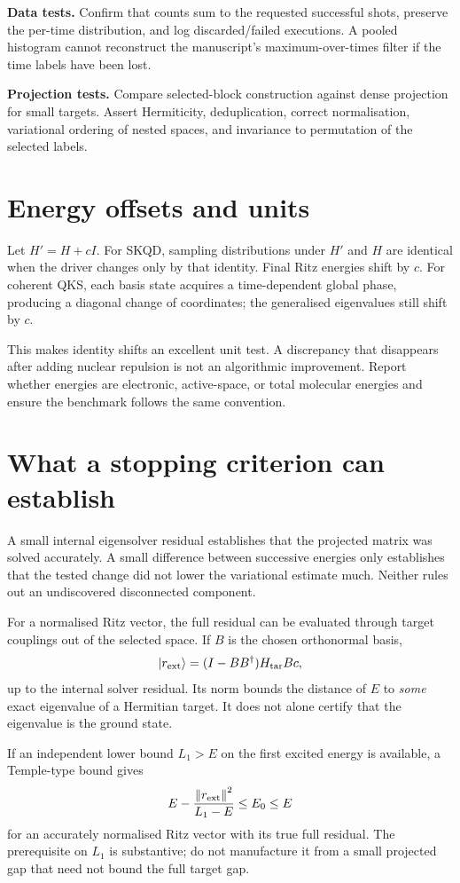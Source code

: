 \documentclass[11pt,a4paper,oneside]{report}
\newcommand{\ket}[1]{\lvert #1\rangle}
\newcommand{\norm}[1]{\left\lVert #1\right\rVert}
\newcommand{\Ht}{H_{\mathrm{tar}}}
\begin{document}
\textbf{Data tests.} Confirm that counts sum to the requested successful shots, preserve the per-time distribution, and log discarded/failed executions. A pooled histogram cannot reconstruct the manuscript's maximum-over-times filter if the time labels have been lost.

\textbf{Projection tests.} Compare selected-block construction against dense projection for small targets. Assert Hermiticity, deduplication, correct normalisation, variational ordering of nested spaces, and invariance to permutation of the selected labels.

\section{Energy offsets and units}
Let $H'=H+cI$. For SKQD, sampling distributions under $H'$ and $H$ are identical when the driver changes only by that identity. Final Ritz energies shift by $c$. For coherent QKS, each basis state acquires a time-dependent global phase, producing a diagonal change of coordinates; the generalised eigenvalues still shift by $c$.

This makes identity shifts an excellent unit test. A discrepancy that disappears after adding nuclear repulsion is not an algorithmic improvement. Report whether energies are electronic, active-space, or total molecular energies and ensure the benchmark follows the same convention.

\section{What a stopping criterion can establish}
A small internal eigensolver residual establishes that the projected matrix was solved accurately. A small difference between successive energies only establishes that the tested change did not lower the variational estimate much. Neither rules out an undiscovered disconnected component.

For a normalised Ritz vector, the full residual can be evaluated through target couplings out of the selected space. If $B$ is the chosen orthonormal basis,
\begin{equation}
\ket{r_{\rm ext}}=(I-BB^\dagger)\Ht Bc,
\end{equation}
up to the internal solver residual. Its norm bounds the distance of $E$ to \emph{some} exact eigenvalue of a Hermitian target. It does not alone certify that the eigenvalue is the ground state.

If an independent lower bound $L_1>E$ on the first excited energy is available, a Temple-type bound gives
\begin{equation}
E-\frac{\norm{r_{\rm ext}}^2}{L_1-E}\le E_0\le E
\end{equation}
for an accurately normalised Ritz vector with its true full residual. The prerequisite on $L_1$ is substantive; do not manufacture it from a small projected gap that need not bound the full target gap.
\end{document}
